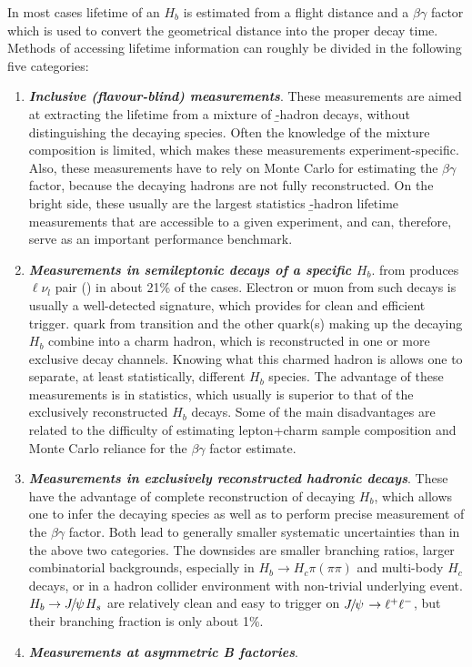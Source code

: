 In most cases lifetime of an $H_b$ is estimated from a flight distance
and a $\beta\gamma$ factor which is used to convert the geometrical
distance into the proper decay time.  Methods of accessing lifetime
information can roughly be divided in the following five categories:
\begin{enumerate}
\item {\bf\em Inclusive (flavour-blind) measurements}.  These
  measurements are aimed at extracting the lifetime from a mixture of
  \b-hadron decays, without distinguishing the decaying species.  Often
  the knowledge of the mixture composition is limited, which makes these
  measurements experiment-specific.  Also, these
  measurements have to rely on Monte Carlo for estimating the
  $\beta\gamma$ factor, because the decaying hadrons are not fully
  reconstructed.  On the bright side, these usually are the largest
  statistics \b-hadron lifetime measurements that are accessible to a
  given experiment, and can, therefore, serve as an important
  performance benchmark.
\item {\bf\em Measurements in semileptonic decays of a specific
  {\boldmath $H_b$\unboldmath}}.  from 
  produces $\ell\nu_l$ pair () in about 21\% of the
  cases.  Electron or muon from such decays is usually a well-detected
  signature, which provides for clean and efficient trigger.
   quark from  transition and the other
  quark(s) making up the decaying $H_b$ combine into a charm hadron,
  which is reconstructed in one or more exclusive decay channels.
  Knowing what this charmed hadron is allows one to separate, at least
  statistically, different $H_b$ species.  The advantage of these
  measurements is in statistics, which usually is superior to that of the
  exclusively reconstructed $H_b$ decays.  Some of the main
  disadvantages are related to the difficulty of estimating lepton+charm
  sample composition and Monte Carlo reliance for the $\beta\gamma$
  factor estimate.
\item {\bf\em Measurements in exclusively reconstructed hadronic decays}.
  These
  have the advantage of complete reconstruction of decaying $H_b$, which
  allows one to infer the decaying species as well as to perform precise
  measurement of the $\beta\gamma$ factor.  Both lead to generally
  smaller systematic uncertainties than in the above two categories.
  The downsides are smaller branching ratios, larger combinatorial
  backgrounds, especially in $H_b\rightarrow H_c\pi(\pi\pi)$ and
  multi-body $H_c$ decays, or in a hadron collider environment with
  non-trivial underlying event.  $H_b\to {J\mskip -3mu/\mskip -2mu\psi\mskip 2mu} H_s$ are relatively
  clean and easy to trigger on ${J\mskip -3mu/\mskip -2mu\psi\mskip 2mu}\to \ell^+\ell^-$, but their
  branching fraction is only about 1\%.
\item {\bf\em Measurements at asymmetric B factories}. 


\end{enumerate}
